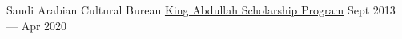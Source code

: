 

\begin{cventries}

  \cventrynodesc
    {Saudi Arabian Cultural Bureau} %
    {\href{https://www.saudibureau.org/en/inside.php?ID=16}{King Abdullah Scholarship Program}} %
    {} %
    {Sept 2013 — Apr 2020} %

\end{cventries}
